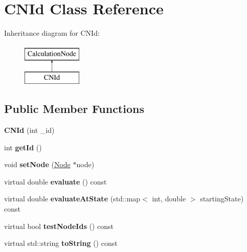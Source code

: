 \hypertarget{classCNId}{}\section{C\+N\+Id Class Reference}
\label{classCNId}
Inheritance diagram for C\+N\+Id\+:\begin{figure}[H]
\begin{center}
\leavevmode
\includegraphics[height=2.000000cm]{classCNId}
\end{center}
\end{figure}
\subsection*{Public Member Functions}
\begin{DoxyCompactItemize}
\item 
{\bfseries C\+N\+Id} (int \+\_\+id)\hypertarget{classCNId_ad36125d5115c0c75783a23e1e4ad55b2}{}\label{classCNId_ad36125d5115c0c75783a23e1e4ad55b2}

\item 
int {\bfseries get\+Id} ()\hypertarget{classCNId_ae0c2d402de892ef8783e6f5281ece008}{}\label{classCNId_ae0c2d402de892ef8783e6f5281ece008}

\item 
void {\bfseries set\+Node} (\hyperlink{classNode}{Node} $\ast$node)\hypertarget{classCNId_a25b7d25adf35e61b0d1b0e67862354f4}{}\label{classCNId_a25b7d25adf35e61b0d1b0e67862354f4}

\item 
virtual double {\bfseries evaluate} () const \hypertarget{classCNId_a5f6b3bbc1a6daaef9a11cdc80aff920c}{}\label{classCNId_a5f6b3bbc1a6daaef9a11cdc80aff920c}

\item 
virtual double {\bfseries evaluate\+At\+State} (std\+::map$<$ int, double $>$ starting\+State) const \hypertarget{classCNId_aacf48e3e3766cc1d54a9af8532d747ec}{}\label{classCNId_aacf48e3e3766cc1d54a9af8532d747ec}

\item 
virtual bool {\bfseries test\+Node\+Ids} () const \hypertarget{classCNId_a0bc1a04e94dfbb047ad53dd6682bf071}{}\label{classCNId_a0bc1a04e94dfbb047ad53dd6682bf071}

\item 
virtual std\+::string {\bfseries to\+String} () const \hypertarget{classCNId_ae853b898d20c008bdddf799ed971f30a}{}\label{classCNId_ae853b898d20c008bdddf799ed971f30a}

\end{DoxyCompactItemize}

